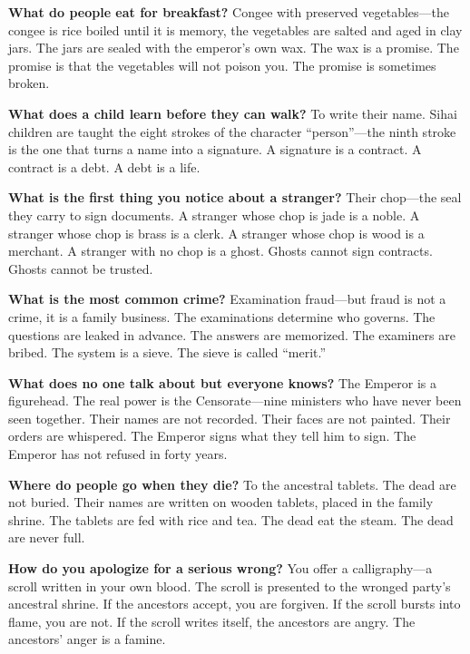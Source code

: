 \vspace{1em}

\begin{almanac}
\textbf{What do people eat for breakfast?} Congee with preserved vegetables---the congee is rice boiled until it is memory, the vegetables are salted and aged in clay jars. The jars are sealed with the emperor's own wax. The wax is a promise. The promise is that the vegetables will not poison you. The promise is sometimes broken.

\textbf{What does a child learn before they can walk?} To write their name. Sihai children are taught the eight strokes of the character ``person''---the ninth stroke is the one that turns a name into a signature. A signature is a contract. A contract is a debt. A debt is a life.

\textbf{What is the first thing you notice about a stranger?} Their chop---the seal they carry to sign documents. A stranger whose chop is jade is a noble. A stranger whose chop is brass is a clerk. A stranger whose chop is wood is a merchant. A stranger with no chop is a ghost. Ghosts cannot sign contracts. Ghosts cannot be trusted.

\textbf{What is the most common crime?} Examination fraud---but fraud is not a crime, it is a family business. The examinations determine who governs. The questions are leaked in advance. The answers are memorized. The examiners are bribed. The system is a sieve. The sieve is called ``merit.''

\textbf{What does no one talk about but everyone knows?} The Emperor is a figurehead. The real power is the Censorate---nine ministers who have never been seen together. Their names are not recorded. Their faces are not painted. Their orders are whispered. The Emperor signs what they tell him to sign. The Emperor has not refused in forty years.

\textbf{Where do people go when they die?} To the ancestral tablets. The dead are not buried. Their names are written on wooden tablets, placed in the family shrine. The tablets are fed with rice and tea. The dead eat the steam. The dead are never full.

\textbf{How do you apologize for a serious wrong?} You offer a calligraphy---a scroll written in your own blood. The scroll is presented to the wronged party's ancestral shrine. If the ancestors accept, you are forgiven. If the scroll bursts into flame, you are not. If the scroll writes itself, the ancestors are angry. The ancestors' anger is a famine.


\end{almanac}
